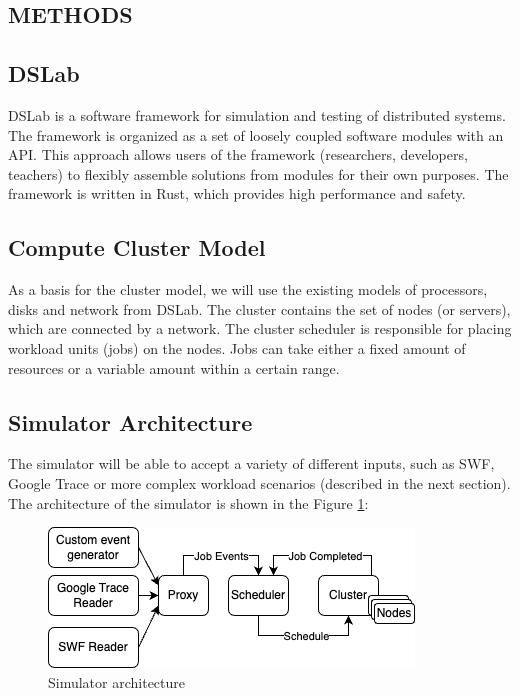\documentclass[a4paper,10pt]{article}
\begin{document}
\begin{multicols*}{2}
\section{{\normalsize M}ETHODS}

\subsection{DSLab}

DSLab is a software framework for simulation and testing of distributed systems. The framework is organized as a set of loosely coupled software modules with an API. This approach allows users of the framework (researchers, developers, teachers) to flexibly assemble solutions from modules for their own purposes. The framework is written in Rust, which provides high performance and safety. 

\subsection{Compute Cluster Model}

As a basis for the cluster model, we will use the existing models of processors, disks and network from DSLab. The cluster contains the set of nodes (or servers), which are connected by a network. The cluster scheduler is responsible for placing workload units (jobs) on the nodes. Jobs can take either a fixed amount of resources or a variable amount within a certain range. 

\subsection{Simulator Architecture}

The simulator will be able to accept a variety of different inputs, such as SWF, Google Trace or more complex workload scenarios (described in the next section). The architecture of the simulator is shown in the Figure \ref{fig:cluster-design}: 
    

\begin{figure}[H]
   \includegraphics[width=\linewidth]{images/cluster-design} 
   \caption{Simulator architecture}
   \label{fig:cluster-design}
\end{figure}



\end{multicols*}
\end{document}
